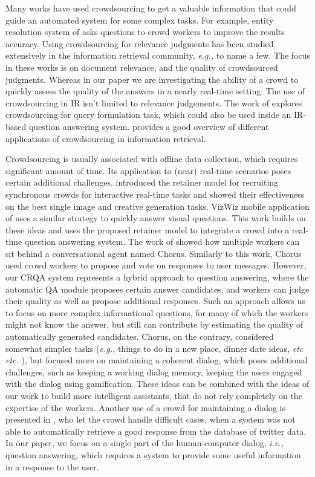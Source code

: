 \documentclass[letterpaper]{article}
\makeatletter
\newcommand{\eg}{\textit{e.g.,}\@\xspace}
\newcommand{\ie}{\textit{i.e.,}\@\xspace}
\newcommand{\etc}{%
    \@ifnextchar{.}%
        {\textit{etc}}%
        {\textit{etc.}\@\xspace}%
}
\makeatother
\begin{document}
Many works have used crowdsourcing to get a valuable information that could guide an automated system for some complex tasks.
For example, entity resolution system of \cite{Whang:2013:QSC:2536336.2536337} asks questions to crowd workers to improve the results accuracy.
Using crowdsourcing for relevance judgments has been studied extensively in the information retrieval community, \eg \cite{Alonso:2008:CRE:1480506.1480508,alonso2011design,grady2010crowdsourcing} to name a few.
The focus in these works is on document relevance, and the quality of crowdsourced judgments.
Whereas in our paper we are investigating the ability of a crowd to quickly assess the quality of the answers in a nearly real-time setting.
The use of crowdsourcing in IR isn't limited to relevance judgements.
The work of \cite{harris2013comparing} explores crowdsourcing for query formulation task, which could also be used inside an IR-based question answering system.
\cite{lease2013crowdsourcing} provides a good overview of different applications of crowdsourcing in information retrieval.

Crowdsourcing is usually associated with offline data collection, which requires significant amount of time.
Its application to (near) real-time scenarios poses certain additional challenges.
\cite{bernstein2011crowds} introduced the retainer model for recruiting synchronous crowds for interactive real-time tasks and showed their effectiveness on the best single image and creative generation tasks.
VizWiz mobile application of \cite{bigham2010vizwiz} uses a similar strategy to quickly answer visual questions.
This work builds on these ideas and uses the proposed retainer model to integrate a crowd into a real-time question answering system.
The work of \cite{Lasecki:2013:CCC:2501988.2502057} showed how multiple workers can sit behind a conversational agent named Chorus.
Similarly to this work, Chorus used crowd workers to propose and vote on responses to user messages.
However, our CRQA system represents a hybrid approach to question answering, where the automatic QA module proposes certain answer candidates, and workers can judge their quality as well as propose additional responses.
Such an approach allows us to focus on more complex informational questions, for many of which the workers might not know the answer, but still can contribute by estimating the quality of automatically generated candidates.
Chorus, on the contrary, considered somewhat simpler tasks (\eg things to do in a new place, dinner date ideas, \etc), but focused more on maintaining a coherent dialog, which poses additional challenges, such as keeping a working dialog memory, keeping the users engaged with the dialog using gamification.
These ideas can be combined with the ideas of our work to build more intelligent assistants, that do not rely completely on the expertise of the workers.
Another use of a crowd for maintaining a dialog is presented in \cite{Bessho:2012:DSU:2392800.2392841}, who let the crowd handle difficult cases, when a system was not able to automatically retrieve a good response from the database of twitter data.
In our paper, we focus on a single part of the human-computer dialog, \ie question answering, which requires a system to provide some useful information in a response to the user.
\end{document}
